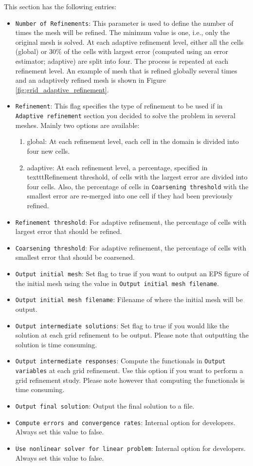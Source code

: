 This section has the following entries:
\begin{itemize}
 \item \texttt{Number of Refinements}: This parameter is used to define the number of times the mesh will be refined. The minimum value is one, i.e., only the original mesh is solved. At each adaptive refinement level, either all the cells (global) or 30\% of the cells with largest error (computed using an error estimator; adaptive) are split into four. The process is repeated at each refinement level. An example of mesh that is refined globally several times and an adaptively refined mesh is shown in Figure \ref{fig:grid_adaptive_refinement}.
   \item  \texttt{Refinement}: This flag specifies the type of refinement to be used if in \texttt{Adaptive refinement} section you decided to solve the problem in several meshes. Mainly two options are available:
  \begin{enumerate}
   \item global: At each refinement level, each cell in the domain is divided into four new cells.
   \item adaptive: At each refinement level, a percentage, specified in texttt{Refinement threshold}, of cells with the largest error are divided into four cells. Also, the percentage of cells in \texttt{Coarsening threshold} with the smallest error are re-merged into one cell if they had been previously refined. 
  \end{enumerate}
 \item \texttt{Refinement threshold}: For adaptive refinement, the percentage of cells with largest error that should be refined.
 \item \texttt{Coarsening threshold}: For adaptive refinement, the percentage of cells with smallest error that should be coarsened.
 \item \texttt{Output initial mesh}: Set flag to true if you want to output an EPS figure of the initial mesh using the value in \texttt{Output initial mesh filename}.
 \item \texttt{Output initial mesh filename}: Filename of where the initial mesh will be output.
 \item \texttt{Output intermediate solutions}: Set flag to true if you would like the solution at each grid refinement to be output. Please note that outputting the solution is time consuming.
 \item \texttt{Output intermediate responses}: Compute the functionals in \texttt{Output variables} at each grid refinement. Use this option if you want to perform a grid refinement study. Please note however that computing the functionals is time consuming.
 \item \texttt{Output final solution}: Output the final solution to a file.
 \item \texttt{Compute errors and convergence rates}: Internal option for developers. Always set this value to false.
 \item \texttt{Use nonlinear solver for linear problem}: Internal option for developers. Always set this value to false.
\end{itemize}

